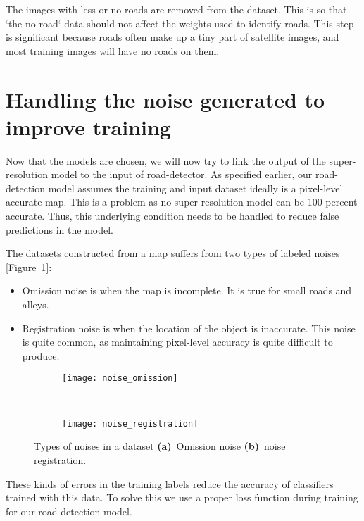 The images with less or no roads are removed from the dataset. This is so that `the no road` data should not affect the weights used to identify roads. This step is significant because roads often make up a tiny part of satellite images, and most training images will have no roads on them.


\section{Handling the noise generated to improve training}
Now that the models are chosen, we will now try to link the output of the super-resolution model to the input of road-detector. As specified earlier, our road-detection model assumes the training and input dataset ideally is a pixel-level accurate map. This is a problem as no super-resolution model can be 100 percent accurate. Thus, this underlying condition needs to be handled to reduce false predictions in the model.

The datasets constructed from a map suffers from two types of labeled noises [Figure~\ref{fig:noise_types}]:
\begin{itemize}
  \item Omission noise is when the map is incomplete. It is true for small roads and alleys.
  \item Registration noise is when the location of the object is inaccurate. This noise is quite common, as maintaining pixel-level accuracy is quite difficult to produce.
\end{itemize}

\begin{figure}[h!]
  \centering
  \begin{subfigure}{0.63\textwidth}
    \texttt{[image: noise\_omission]}
    \caption{}
  \end{subfigure}~
  \begin{subfigure}{0.35\textwidth}
    \texttt{[image: noise\_registration]}
    \caption{}
  \end{subfigure}
  \caption[Types of noises in a dataset]{Types of noises in a dataset \textbf{(a)}~Omission noise \textbf{(b)}~noise registration.}
  \label{fig:noise_types}
\end{figure}

These kinds of errors in the training labels reduce the accuracy of classifiers trained with this data. To solve this we use a proper loss function during training for our road-detection model.
